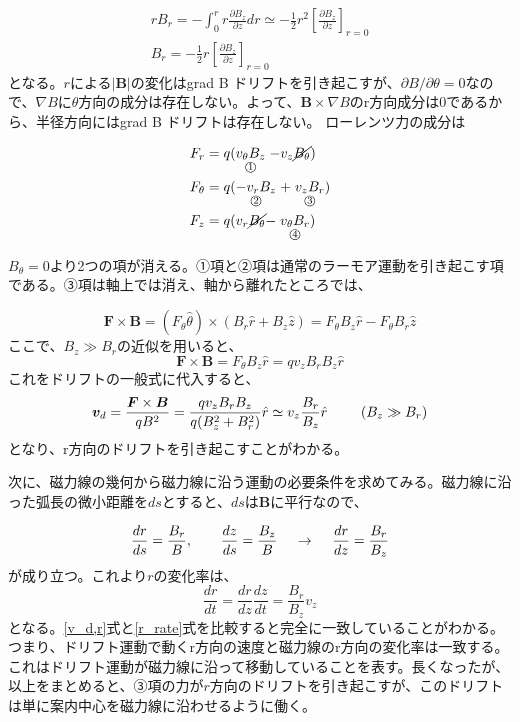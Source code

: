 \documentclass{ltjsarticle}
\numberwithin{equation}{section} %
\newcommand{\underlab}[3][.35ex]{%
  \mathrel{\mathop{#2}\limits_{\mathclap{\lower#1\hbox{\text{\footnotesize\textcircled{\scriptsize #3}}}}}}%
}
\begin{document}
\begin{equation}
  \begin{gathered}
    rB_r = -\int_{0}^{r} r\frac{\partial B_z}{\partial z}dr \simeq -\frac{1}{2}r^2\left[\frac{\partial B_z}{\partial z}\right]_{r=0}\\
    B_r = -\frac{1}{2}r\left[\frac{\partial B_z}{\partial z}\right]_{r=0}    
  \end{gathered} \label{term1234}
\end{equation}
となる。$r$による$|\bm{B}|$の変化はgrad B ドリフトを引き起こすが、$\partial B/\partial \theta = 0$なので、$\nabla B$に$\theta$方向の成分は存在しない。よって、$\bm{B}\times \nabla B$のr方向成分は0であるから、半径方向にはgrad B ドリフトは存在しない。
ローレンツ力の成分は

\begin{align}
  \begin{split}
    F_r     &= q(\underlab{v_\theta B_z}{1}-v_z \cancel{B_\theta})\\
    F_\theta&= q(\underlab{-v_r B_z}{2}+\underlab{v_z B_r}{3})\\
    F_z     &= q(v_r \cancel{B_\theta}-\underlab{v_\theta B_r}{4})
  \end{split}
\end{align}

$B_\theta = 0$より2つの項が消える。➀項と➁項は通常のラーモア運動を引き起こす項である。➂項は軸上では消え、軸から離れたところでは、

\[
  \bm{F} \times \bm{B} = (F_\theta \hat{\theta}) \times (B_r \hat{r}+B_z \hat{z}) = F_\theta B_z \hat{r} - F_\theta B_r \hat{z}
\]
ここで、$B_z \gg B_r$の近似を用いると、
\[
 \bm{F} \times \bm{B} = F_\theta B_z \hat{r} = qv_zB_rB_z\hat{r}
\]
これをドリフトの一般式に代入すると、
\begin{equation}
  \bm{v}_{d} = \frac{\bm{F} \times \bm{B}}{qB^2} = \frac{qv_zB_rB_z}{q(B_z^2+B_r^2)}\hat{r} \simeq v_z \frac{B_r}{B_z}\hat{r} \hspace{2pc} (B_z \gg B_r) \label{v_d,r}
\end{equation}
となり、r方向のドリフトを引き起こすことがわかる。

次に、磁力線の幾何から磁力線に沿う運動の必要条件を求めてみる。磁力線に沿った弧長の微小距離を$ds$とすると、$ds$は$\bm{B}$に平行なので、

\[
 \frac{dr}{ds} = \frac{B_r}{B}, \qquad \frac{dz}{ds} = \frac{B_z}{B} \hspace{1pc} \to \hspace{1pc} \frac{dr}{dz} = \frac{B_r}{B_z} 
\]
が成り立つ。これより$r$の変化率は、
\begin{equation}
  \frac{dr}{dt} = \frac{dr}{dz}\frac{dz}{dt} = \frac{B_r}{B_z}v_z \label{r_rate}
\end{equation}
となる。\eqref{v_d,r}式と\eqref{r_rate}式を比較すると完全に一致していることがわかる。つまり、ドリフト運動で動くr方向の速度と磁力線のr方向の変化率は一致する。
これはドリフト運動が磁力線に沿って移動していることを表す。長くなったが、以上をまとめると、➂項の力が$r$方向のドリフトを引き起こすが、このドリフトは単に案内中心を磁力線に沿わせるように働く。
\end{document}
